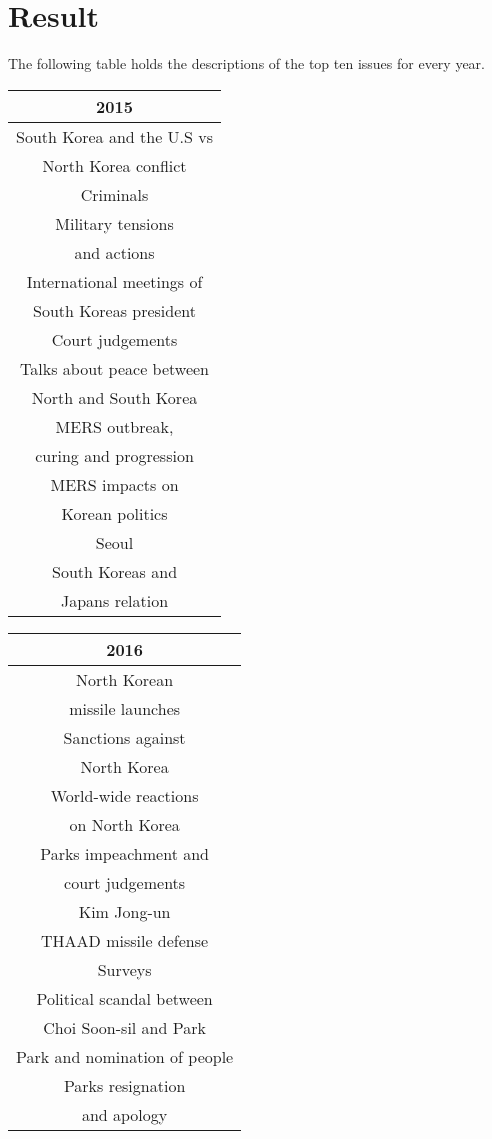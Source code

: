 \section{Result}
The following table holds the descriptions of the top ten issues for every year.

\begin{table}[ht]
  \hspace{1cm}
  \begin{tabular}{c}
  2015 \\
  \hline
  \hline
  South Korea and the U.S vs \\
   North Korea conflict \\
   \hline
   Criminals \\
   \hline
   Military tensions \\
   and actions \\
  \hline
  International meetings of \\
  South Koreas president \\
  \hline
  Court judgements \\
  \hline
  Talks about peace between \\
  North and South Korea \\
  \hline
  MERS outbreak, \\
  curing and progression \\
  \hline
  MERS impacts on \\
  Korean politics \\
  \hline
  Seoul \\
  \hline
  South Koreas and \\
  Japans relation \\
  \end{tabular}
\end{table}

\begin{table}[ht]
  \hspace{1cm}
  \begin{tabular}{c}
  2016 \\
  \hline
  \hline
  North Korean \\
  missile launches \\
  \hline
  Sanctions against \\
  North Korea \\
  \hline
  World-wide reactions \\
  on North Korea \\
  \hline
  Parks impeachment and \\
  court judgements \\
  \hline
  Kim Jong-un \\
  \hline
  THAAD missile defense \\
  \hline
  Surveys \\
  \hline
  Political scandal between \\
  Choi Soon-sil and Park \\
  \hline
  Park and nomination of people \\
  \hline
  Parks resignation \\
  and apology \\
  \end{tabular}
\end{table}

